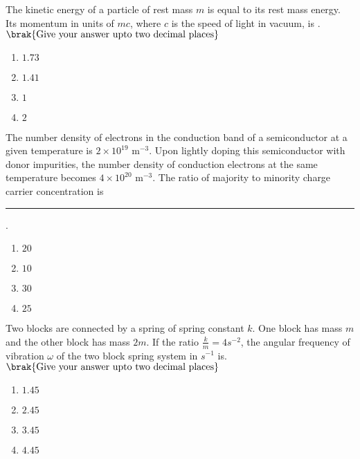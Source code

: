 \iffalse
	\title{2016-PH-27-39}
	\author{EE24Btech11006 - Arnav Mahishi}
	\section{ph}
	\chapter{2016}
\fi
\item{
The kinetic energy of a particle of rest mass $m$ is equal to its rest mass energy. Its momentum in units of $mc$, where $c$ is the speed of light in vacuum, is .$\brak{\text{Give your answer upto two decimal places}}$
\begin{multicols}{4}
\begin{enumerate}
\item $1.73$
\item $1.41$
\item $1$
\item $2$
\end{enumerate}
\end{multicols}
}
\item{
The number density of electrons in the conduction band of a semiconductor at a given temperature is $2 \times 10^{19} \text{ m}^{-3}$. Upon lightly doping this semiconductor with donor impurities, the number density of conduction electrons at the same temperature becomes $4 \times 10^{20} \text{ m}^{-3}$. The ratio of majority to minority charge carrier concentration is \rule{3cm}{0.15mm}.
\begin{multicols}{2}
\begin{enumerate}
\item $20$ 
\item $10$
\item $30$
\item $25$
\end{enumerate}
\end{multicols}}
\item{
Two blocks are connected by a spring of spring constant $k$. One block has mass $m$ and the other block has mass $2m$. If the ratio $\frac{k}{m}=4s^{-2}$, the angular frequency of vibration $\omega$ of the two block spring system in $s^{-1}$
is. $\brak{\text{Give your answer upto two decimal places}}$
\begin{multicols}{4}
\begin{enumerate}
\item $1.45$
\item $2.45$
\item $3.45$
\item $4.45$
\end{enumerate}
\end{multicols}
}
